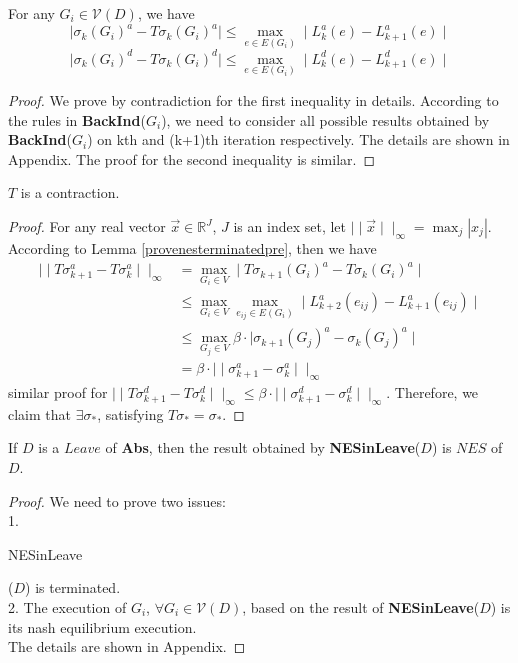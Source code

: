 \documentclass{acm_proc_article-sp}
\begin{document}
\begin{Lemma}
\label{provenesterminatedpre}
For any $G_{\textit{i}}\in \mathcal{V}(D)$, we have
$$\mid \sigma_{k}(G_{\textit{i}})^a- T\sigma_{k}(G_{\textit{i}})^a\mid \leq \underset{e\in E(G_{\textit{i}})}{\max} \mid L_{k}^a(e)- L_{k+1}^a(e)\mid$$
$$\mid \sigma_{k}(G_{\textit{i}})^d- T\sigma_{k}(G_{\textit{i}})^d\mid \leq \underset{e\in E(G_{\textit{i}})}{\max} \mid L_{k}^d(e)- L_{k+1}^d(e)\mid$$
\end{Lemma}

\begin{proof}
We prove by contradiction for the first inequality in details. According to the rules in \textbf{BackInd}($G_{\textit{i}}$), we need to consider all possible results obtained by \textbf{BackInd}($G_{\textit{i}}$) on kth and (k+1)th iteration respectively. The details are shown in Appendix. The proof for the second inequality is similar.
\end{proof}

\begin{Lemma}
\label{provenesterminated}
$T$ is a contraction.
\end{Lemma}
\begin{proof}
For any real vector $\overrightarrow{x}\in \mathds{R}^J$, $J$ is an index set, let $\mid \mid \overrightarrow{x}\mid\mid_{\infty}=\max_{j}|x_{j}|$. According to Lemma \ref{provenesterminatedpre}, then we have
\begin{align*}
\mid\mid T\sigma_{k+1}^a-T\sigma_{k}^a\mid\mid_{\infty}&=\underset{G_{i}\in V}{\max}\mid T\sigma_{k+1}(G_{i})^a-T\sigma_{k}(G_{i})^a \mid\\
&\leq\underset{G_{i}\in V}{\max}\underset{e_{\textit{ij}}\in E(G_{\textit{i}})}{\max} \mid L_{k+2}^a(e_{\textit{ij}})- L_{k+1}^a(e_{\textit{ij}})\mid\\
&\leq\underset{G_{j}\in V}{\max}\beta\cdot \mid   \sigma_{k+1}(G_{\textit{j}})^a-\sigma_{k}(G_{\textit{j}})^a \mid\\
&=\beta\cdot\mid\mid \sigma_{k+1}^a-\sigma_{k}^a\mid\mid_{\infty}
\end{align*}
similar proof for $\mid\mid T\sigma_{k+1}^d-T\sigma_{k}^d\mid\mid_{\infty}\leq\beta\cdot\mid\mid \sigma_{k+1}^d-\sigma_{k}^d\mid\mid_{\infty}$. Therefore, we claim that $\exists \sigma_{*}$, satisfying $T\sigma_{*}=\sigma_{*}$.
\end{proof}

\begin{Theorem}
\label{provenesinleave}
If $D$ is a $\textit{Leave}$ of \textbf{Abs}, then the result obtained by \textbf{NESinLeave}($D$) is $\textit{NES}$ of $D$.
\end{Theorem}
\begin{proof}
We need to prove two issues: \\
1. \begin{bf}NESinLeave\end{bf}($D$) is terminated.\\
2. The execution of $G_{\textit{i}}$, $\forall G_{\textit{i}}\in \mathcal{V}(D)$, based on the result of \textbf{NESinLeave}($D$) is its nash equilibrium execution.\\
The details are shown in Appendix.
\end{proof}
\end{document}
